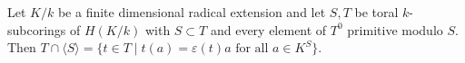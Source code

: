 Let $K/k$ be a finite dimensional radical extension and let $S, T$ be toral $k$-subcorings of $H(K/k)$ with $S \subset T$ and every element of $T^0$ primitive modulo $S$. Then $T \cap \langle S \rangle = \{t \in T \mid t(a) = \varepsilon(t)a \text{ for all } a \in K^S\}$.
